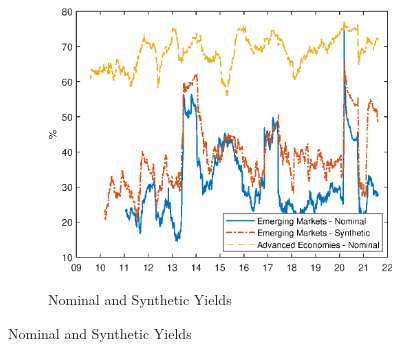 \documentclass[a4paper, 12pt]{article}
\begin{document}
\begin{appendices}
	\begin{figure}[tbph]
		\caption{Connectedness of 10-Year Yields and Components} \label{fig:dyindex10y}
		\begin{center}
			\begin{minipage}{0.9\linewidth}
				\begin{center}
					\begin{subfigure}[t]{\linewidth}
						\includegraphics[trim={0cm 0cm 0cm 0cm},clip,height=0.33\textheight,width=\linewidth]{../Figures/dy_index10y_nomsyn.eps} \\
						\vspace{-0.35cm}
						\caption{Nominal and Synthetic Yields} \label{subfig:dyindex10ynomsyn}
						\vspace{0.4cm}
					\end{subfigure}
					

\end{center}
\end{minipage}
\end{center}
\end{figure}
\end{appendices}
\end{document}
